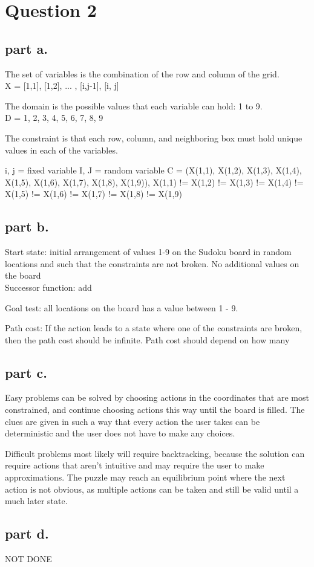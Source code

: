 \section{Question 2}

\subsection{part a.}
The set of variables is the combination of the row and column of the grid. \\
X = {[1,1], [1,2], ... , [i,j-1], [i, j]}

The domain is the possible values that each variable can hold: 1 to 9. \\
D = {1, 2, 3, 4, 5, 6, 7, 8, 9}

The constraint is that each row, column, and neighboring box must hold unique values in each of the variables.

i, j = fixed variable
I, J = random variable
C = {(X(1,1), X(1,2), X(1,3), X(1,4), X(1,5), X(1,6), X(1,7), X(1,8), X(1,9)), X(1,1) != X(1,2) != X(1,3) != X(1,4) != X(1,5) != X(1,6) != X(1,7) != X(1,8) != X(1,9)}

\subsection{part b.}
Start state: initial arrangement of values 1-9 on the Sudoku board in random locations and such that the constraints are not broken. No additional values on the board \\
Successor function: add

Goal test: all locations on the board has a value between 1 - 9.

Path cost: If the action leads to a state where one of the constraints are broken, then the path cost should be infinite. Path cost should depend on how many

\subsection{part c.}
Easy problems can be solved by choosing actions in the coordinates that are most constrained, and continue choosing actions this way until the board is filled. The clues are given in such a way that every action the user takes can be deterministic and the user does not have to make any choices.


Difficult problems most likely will require backtracking, because the solution can require actions that aren't intuitive and may require the user to make approximations. The puzzle may reach an equilibrium point where the next action is not obvious, as multiple actions can be taken and still be valid until a much later state.

\subsection{part d.}
NOT DONE
